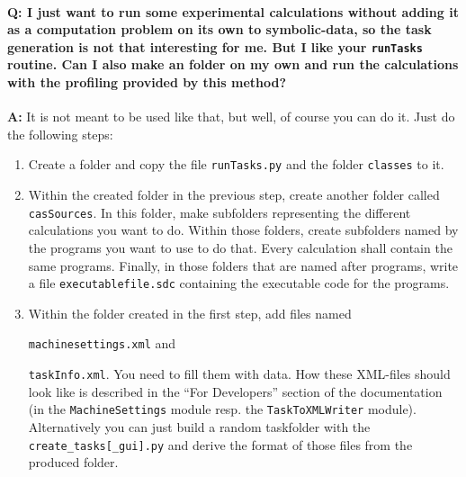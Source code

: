 \documentclass[11pt,a4paper]{amsart}
\numberwithin{equation}{section}
\theoremstyle{definition}
\begin{document}
\paragraph{\textbf{Q:} I just want to run some experimental calculations without adding it as a computation problem on its own to symbolic-data, so the task generation is not that interesting for me. But I like your \texttt{runTasks} routine. Can I also make an folder on my own and run the calculations with the profiling provided by this method?}

\textbf{A:} It is not meant to be used like that, but well, of course you can do it. Just do the following steps:
\begin{enumerate}
  \item Create a folder and copy the file \texttt{runTasks.py} and the folder \texttt{classes} to it.
  \item Within the created folder in the previous step, create another folder called \texttt{casSources}. In this folder, make subfolders representing the different calculations you want to do. Within those folders, create subfolders named by the programs you want to use to do that. Every calculation shall contain the same programs. Finally, in those folders that are named after programs, write a file \texttt{executablefile.sdc} containing the executable code for the programs.
  \item Within the folder created in the first step, add files named

\texttt{machinesettings.xml} 
and

\texttt{taskInfo.xml}. You need to fill them with data. How these XML-files should look like is described in the ``For Developers'' section of the documentation (in the \texttt{MachineSettings} module resp. the \texttt{TaskToXMLWriter} module). Alternatively you can just build a random taskfolder with the \texttt{create\_tasks[\_gui].py} and derive the format of those files from the produced folder.
\end{enumerate}
\end{document}
